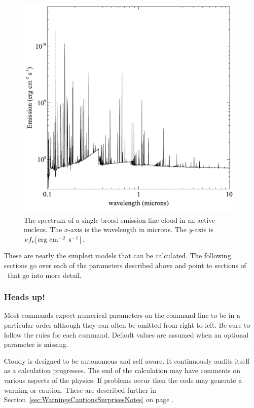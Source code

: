 \documentclass[12pt,twoside]{article}
\begin{document}
{\begin{figure}
\begin{center}
\includegraphics[clip=on,width=0.8\columnwidth,height=0.8\textheight,keepaspectratio]{BLR_spectrum}
\end{center}
\caption{The spectrum of a single broad emission-line
cloud in an active nucleus.
The $x$-axis is the wavelength in microns.
The $y$-axis is $\nu f_\nu [{\rm\thinspace erg}\, \mbox{${\rm\thinspace cm}^{-2}\,$}\, \mbox{${\rm\thinspace s}^{-1}\,$}]$.}
\label{fig:BLR_spectrum}
\end{figure}

These are nearly the simplest models that can be calculated.  The
following sections go over each of the parameters described above and point
to sections of \Hazy\ that go into more detail.

\subsubsection{Heads up!}

Most commands expect numerical parameters
on the command line to be in
a particular order although they can often be omitted from right to left.
Be sure to follow the rules for each command.  Default values are assumed
when an optional parameter is missing.

Cloudy is designed to be autonomous and self aware.  It continuously
audits itself as a calculation progresses.  The end of the calculation may
have comments on various aspects of the
physics.
If problems occur then
the code may generate a warning or caution.
These are described further in Section~\ref{sec:WarningsCautionsSurprisesNotes}
on page \pageref{sec:WarningsCautionsSurprisesNotes}.

}
\end{document}
